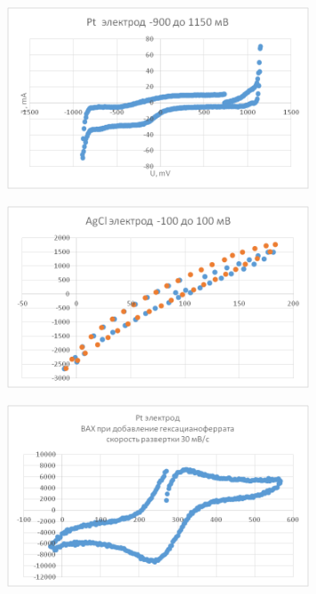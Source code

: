 \documentclass[a4paper, 12pt]{article}
\begin{document}
\begin{figure}[h!]
	\centering
	\caption{}	\includegraphics[width=0.8\textwidth]{image004.png}
\end{figure}

\begin{figure}[h!]
	\centering
	\caption{}	\includegraphics[width=0.8\textwidth]{image006.png}
\end{figure}


\begin{figure}[h!]
	\centering
	\caption{}	\includegraphics[width=0.8\textwidth]{image008.png}
\end{figure}

\newpage
\end{document}
